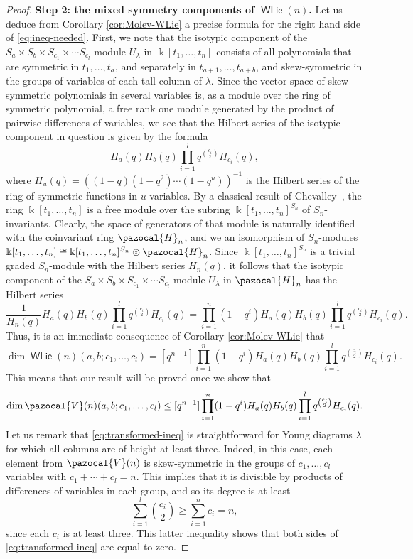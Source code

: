 \documentclass[11pt,reqno]{amsart}
\theoremstyle{plain}
\theoremstyle{definition}
\theoremstyle{remark}
\newcommand{\bk}{\Bbbk}
\DeclareMathOperator{\WLie}{\mathsf{WLie}}
\def\calH{\pazocal{H}}
\def\calV{\pazocal{V}}
\begin{document}
\begin{proof}
\textbf{Step 2: the mixed symmetry components of $\WLie(n)$. }
Let us deduce from Corollary \ref{cor:Molev-WLie} a precise formula for the right hand side of \eqref{eq:ineq-needed}. First, we note that the isotypic component of the $S_a\times S_b\times S_{c_1}\times \cdots S_{c_l}$-module $U_\lambda$ in $\bk[t_1,\ldots,t_n]$ consists of all polynomials that are symmetric in $t_1,\ldots,t_a$, and separately in $t_{a+1},\ldots,t_{a+b}$, and skew-symmetric in the groups of variables of each tall column of $\lambda$. Since the vector space of skew-symmetric polynomials in several variables is, as a module over the ring of symmetric polynomial, a free rank one module generated by the product of pairwise differences of variables, we see that the Hilbert series of the isotypic component in question is given by the formula
 \[
H_a(q)H_b(q)\prod_{i=1}^lq^{\binom{c_i}2}H_{c_i}(q), 
 \]
where $H_u(q)=((1-q)(1-q^2)\cdots(1-q^u))^{-1}$     
is the Hilbert series of the ring of symmetric functions in $u$ variables. By a classical result of Chevalley~\cite{MR72877}, the ring $\bk[t_1,\ldots,t_n]$ is a free module over the subring $\bk[t_1,\ldots,t_n]^{S_n}$ of $S_n$-invariants. Clearly, the space of generators of that module is naturally identified with the coinvariant ring $\calH_n$, and we an isomorphism of $S_n$-modules 
$\bk[t_1,\ldots,t_n]\cong \bk[t_1,\ldots,t_n]^{S_n}\otimes  \calH_n$. Since $\bk[t_1,\ldots,t_n]^{S_n}$ is a trivial graded $S_n$-module with the Hilbert series $H_n(q)$, it follows that the isotypic component of the $S_a\times S_b\times S_{c_1}\times \cdots S_{c_l}$-module $U_\lambda$ in $\calH_n$ has the Hilbert series 
 \[
\frac{1}{H_n(q)}H_a(q)H_b(q)\prod_{i=1}^lq^{\binom{c_i}2}H_{c_i}(q)=\prod_{i=1}^n(1-q^i)H_a(q)H_b(q)\prod_{i=1}^lq^{\binom{c_i}2}H_{c_i}(q). 
 \]
Thus, it is an immediate consequence of Corollary \ref{cor:Molev-WLie} that
 \[
\dim\WLie(n)(a,b;c_1,\ldots,c_l)=[q^{n-1}]\prod_{i=1}^n(1-q^i)H_a(q)H_b(q)\prod_{i=1}^lq^{\binom{c_i}2}H_{c_i}(q) . 
 \]
This means that our result will be proved once we show that 
\begin{equation}\label{eq:transformed-ineq}
\dim\calV(n)(a,b;c_1,\ldots,c_l)\le [q^{n-1}]\prod_{i=1}^n(1-q^i)H_a(q)H_b(q)\prod_{i=1}^lq^{\binom{c_i}2}H_{c_i}(q).    
\end{equation}
Let us remark that \eqref{eq:transformed-ineq} is straightforward for Young diagrams $\lambda$ for which all columns are of height at least three. Indeed, in this case,  each element from $\calV(n)$ is skew-symmetric in the groups of $c_1,\ldots,c_l$ variables with $c_1+\cdots+c_l=n$. This implies that it is divisible by products of differences of variables in each group, and so its degree is at least 
 \[
\sum_{i=1}^l\binom{c_i}2\ge \sum_{i=1}^n c_i=n, 
 \]
since each $c_i$ is at least three. This latter inequality shows that both sides of \eqref{eq:transformed-ineq} are equal to zero. 


\end{proof}
\end{document}
